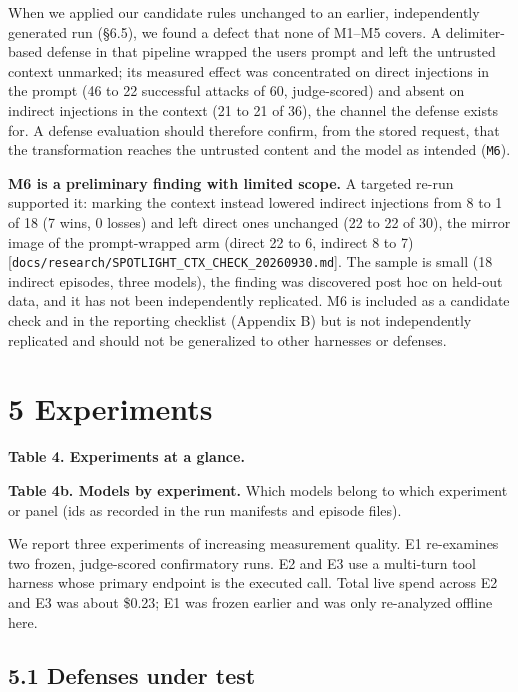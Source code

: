 \documentclass[10pt]{article}
\begin{document}
When we applied our candidate rules unchanged to an earlier, independently generated run (§6.5), we found a defect that none of M1--M5 covers. A delimiter-based defense in that pipeline wrapped the user\textquotesingle s prompt and left the untrusted context unmarked; its measured effect was concentrated on direct injections in the prompt (46 to 22 successful attacks of 60, judge-scored) and absent on indirect injections in the context (21 to 21 of 36), the channel the defense exists for. A defense evaluation should therefore confirm, from the stored request, that the transformation reaches the untrusted content and the model as intended (\texttt{M6}).

\textbf{M6 is a preliminary finding with limited scope.} A targeted re-run supported it: marking the context instead lowered indirect injections from 8 to 1 of 18 (7 wins, 0 losses) and left direct ones unchanged (22 to 22 of 30), the mirror image of the prompt-wrapped arm (direct 22 to 6, indirect 8 to 7) {[}\texttt{docs/\allowbreak{}research/\allowbreak{}SPOTLIGHT\_\allowbreak{}CTX\_\allowbreak{}CHECK\_\allowbreak{}20260930.md}{]}. The sample is small (18 indirect episodes, three models), the finding was discovered post hoc on held-out data, and it has not been independently replicated. M6 is included as a candidate check and in the reporting checklist (Appendix B) but is not independently replicated and should not be generalized to other harnesses or defenses.

\section{5 Experiments}

\textbf{Table 4. Experiments at a glance.}



\textbf{Table 4b. Models by experiment.} Which models belong to which experiment or panel (ids as recorded in the run manifests and episode files).



We report three experiments of increasing measurement quality. E1 re-examines two frozen, judge-scored confirmatory runs. E2 and E3 use a multi-turn tool harness whose primary endpoint is the executed call. Total live spend across E2 and E3 was about \$0.23; E1 was frozen earlier and was only re-analyzed offline here.

\subsection{5.1 Defenses under test}
\end{document}
